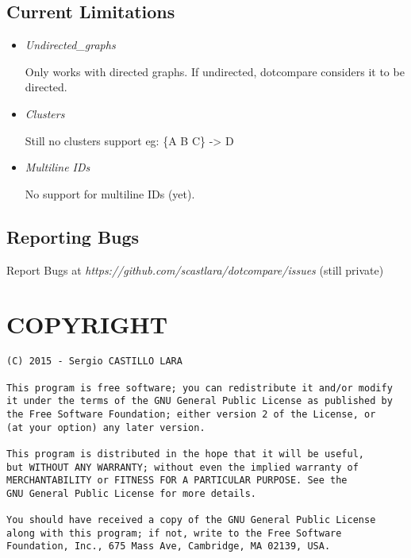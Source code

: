 \documentclass[10pt]{article}
\begin{document}
\subsection{Current Limitations}\label{current-limitations}

\begin{itemize}
\item
  \emph{Undirected\_graphs}

  Only works with directed graphs. If undirected, dotcompare considers
  it to be directed.
\item
  \emph{Clusters}

  Still no clusters support eg: \{A B C\} -\textgreater{} D
\item
  \emph{Multiline IDs}

  No support for multiline IDs (yet).
\end{itemize}

\subsection{Reporting Bugs}\label{reporting-bugs}

Report Bugs at \emph{https://github.com/scastlara/dotcompare/issues}
(still private)

\section{COPYRIGHT}\label{copyright}

\begin{verbatim}
(C) 2015 - Sergio CASTILLO LARA

This program is free software; you can redistribute it and/or modify
it under the terms of the GNU General Public License as published by
the Free Software Foundation; either version 2 of the License, or
(at your option) any later version.

This program is distributed in the hope that it will be useful,
but WITHOUT ANY WARRANTY; without even the implied warranty of
MERCHANTABILITY or FITNESS FOR A PARTICULAR PURPOSE. See the
GNU General Public License for more details.

You should have received a copy of the GNU General Public License
along with this program; if not, write to the Free Software
Foundation, Inc., 675 Mass Ave, Cambridge, MA 02139, USA.
\end{verbatim}
\end{document}
